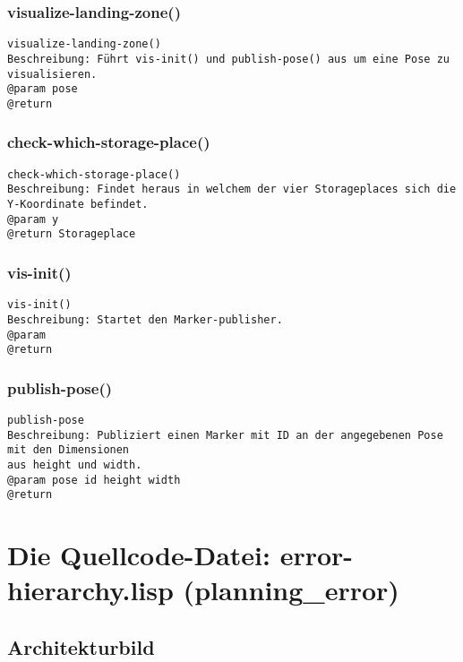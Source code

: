 \documentclass{suturo}
\begin{document}
\subsubsection{visualize-landing-zone()}
\begin{verbatim}
visualize-landing-zone()
Beschreibung: Führt vis-init() und publish-pose() aus um eine Pose zu visualisieren.
@param pose
@return 
\end{verbatim}

\subsubsection{check-which-storage-place()}
\begin{verbatim}
check-which-storage-place()
Beschreibung: Findet heraus in welchem der vier Storageplaces sich die Y-Koordinate befindet.
@param y
@return Storageplace
\end{verbatim}

\subsubsection{vis-init()}
\begin{verbatim}
vis-init()
Beschreibung: Startet den Marker-publisher.
@param 
@return 
\end{verbatim}

\subsubsection{publish-pose()}
\begin{verbatim}
publish-pose
Beschreibung: Publiziert einen Marker mit ID an der angegebenen Pose mit den Dimensionen
aus height und width.
@param pose id height width
@return 
\end{verbatim}

\section{Die Quellcode-Datei: error-hierarchy.lisp (planning\_error)}
\subsection{Architekturbild}
\begin{figure}[!htb]
\end{figure}
\end{document}
